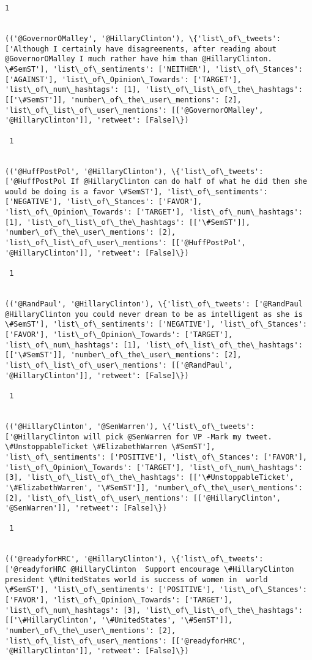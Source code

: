 \documentclass[11pt]{article}
\begin{document}
\begin{Verbatim}[commandchars=\\\{\}]
 1
 

(('@GovernorOMalley', '@HillaryClinton'), \{'list\_of\_tweets': ['Although I certainly have disagreements, after reading about @GovernorOMalley I much rather have him than @HillaryClinton. \#SemST'], 'list\_of\_sentiments': ['NEITHER'], 'list\_of\_Stances': ['AGAINST'], 'list\_of\_Opinion\_Towards': ['TARGET'], 'list\_of\_num\_hashtags': [1], 'list\_of\_list\_of\_the\_hashtags': [['\#SemST']], 'number\_of\_the\_user\_mentions': [2], 'list\_of\_list\_of\_user\_mentions': [['@GovernorOMalley', '@HillaryClinton']], 'retweet': [False]\})

 1
 

(('@HuffPostPol', '@HillaryClinton'), \{'list\_of\_tweets': ['@HuffPostPol If @HillaryClinton can do half of what he did then she would be doing is a favor \#SemST'], 'list\_of\_sentiments': ['NEGATIVE'], 'list\_of\_Stances': ['FAVOR'], 'list\_of\_Opinion\_Towards': ['TARGET'], 'list\_of\_num\_hashtags': [1], 'list\_of\_list\_of\_the\_hashtags': [['\#SemST']], 'number\_of\_the\_user\_mentions': [2], 'list\_of\_list\_of\_user\_mentions': [['@HuffPostPol', '@HillaryClinton']], 'retweet': [False]\})

 1
 

(('@RandPaul', '@HillaryClinton'), \{'list\_of\_tweets': ['@RandPaul @HillaryClinton you could never dream to be as intelligent as she is \#SemST'], 'list\_of\_sentiments': ['NEGATIVE'], 'list\_of\_Stances': ['FAVOR'], 'list\_of\_Opinion\_Towards': ['TARGET'], 'list\_of\_num\_hashtags': [1], 'list\_of\_list\_of\_the\_hashtags': [['\#SemST']], 'number\_of\_the\_user\_mentions': [2], 'list\_of\_list\_of\_user\_mentions': [['@RandPaul', '@HillaryClinton']], 'retweet': [False]\})

 1
 

(('@HillaryClinton', '@SenWarren'), \{'list\_of\_tweets': ['@HillaryClinton will pick @SenWarren for VP -Mark my tweet. \#UnstoppableTicket \#ElizabethWarren \#SemST'], 'list\_of\_sentiments': ['POSITIVE'], 'list\_of\_Stances': ['FAVOR'], 'list\_of\_Opinion\_Towards': ['TARGET'], 'list\_of\_num\_hashtags': [3], 'list\_of\_list\_of\_the\_hashtags': [['\#UnstoppableTicket', '\#ElizabethWarren', '\#SemST']], 'number\_of\_the\_user\_mentions': [2], 'list\_of\_list\_of\_user\_mentions': [['@HillaryClinton', '@SenWarren']], 'retweet': [False]\})

 1
 

(('@readyforHRC', '@HillaryClinton'), \{'list\_of\_tweets': ['@readyforHRC @HillaryClinton  Support encourage \#HillaryClinton president \#UnitedStates world is success of women in  world \#SemST'], 'list\_of\_sentiments': ['POSITIVE'], 'list\_of\_Stances': ['FAVOR'], 'list\_of\_Opinion\_Towards': ['TARGET'], 'list\_of\_num\_hashtags': [3], 'list\_of\_list\_of\_the\_hashtags': [['\#HillaryClinton', '\#UnitedStates', '\#SemST']], 'number\_of\_the\_user\_mentions': [2], 'list\_of\_list\_of\_user\_mentions': [['@readyforHRC', '@HillaryClinton']], 'retweet': [False]\})


\end{Verbatim}
\end{document}
